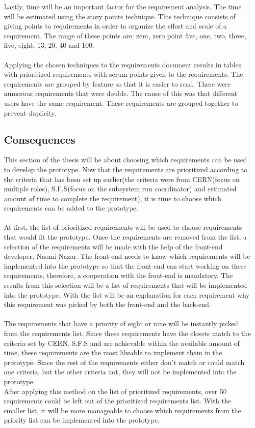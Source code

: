 \documentclass[paper=a4, fontsize=11pt,twoside]{scrartcl}	%
\begin{document}
Lastly, time will be an important factor for the requirement analysis. The time will be estimated using the story points technique. This technique consists of giving  points to requirements in order to organize the effort and scale of a requirement. The range of these points are:  zero, zero point five, one, two, three, five, eight, 13, 20, 40 and 100. \\ \\
Applying the chosen techniques to the requirements document results in tables with prioritized requirements with scrum points given to the requirements. The requirements are grouped by feature so that it is easier to read. There were numerous requirements that were double. The cause of this was that different users have the same requirement. These requirements are grouped together to prevent duplicity. \\

\newpage
\subsection{Consequences}
This section of the thesis will be about choosing which requirements can be used to develop the prototype. Now that the requirements are prioritized according to the criteria that has been set up earlier(the criteria were from CERN(focus on multiple roles), S.F.S(focus on the subsystem run coordinator) and estimated amount of time to complete the requirement), it is time to choose which requirements can be added to the prototype. \\ \\ 
At first, the list of prioritized requirements will be used to choose requirements that would fit the prototype. Once the requirements are removed from the list, a selection of the requirements will be made with the help of the front-end developer, Naomi Nazar. The front-end needs to know which requirements will be implemented into the prototype so that the front-end can start working on these requirements, therefore, a cooperation with the front-end is mandatory. The results from this selection will be a list of requirements that will be implemented into the prototype. With the list will be an explanation for each requirement why this requirement was picked by both the front-end and the back-end. \\ \\
The requirements that have a priority of eight or nine will be instantly picked from the requirements list. Since these requirements have the closets match to the criteria set by CERN, S.F.S and are achievable within the available amount of time, these requirements are the most likeable to implement them in the prototype. Since the rest of the requirements either don't match or could match one criteria, but the other criteria not, they will not be implemented into the prototype. \\
After applying this method on the list of prioritized requirements, over 50 requirements could be left out of the prioritized requirements list. With the smaller list, it will be more manageable to choose which requirements from the priority list can be implemented into the prototype. \\
\end{document}
